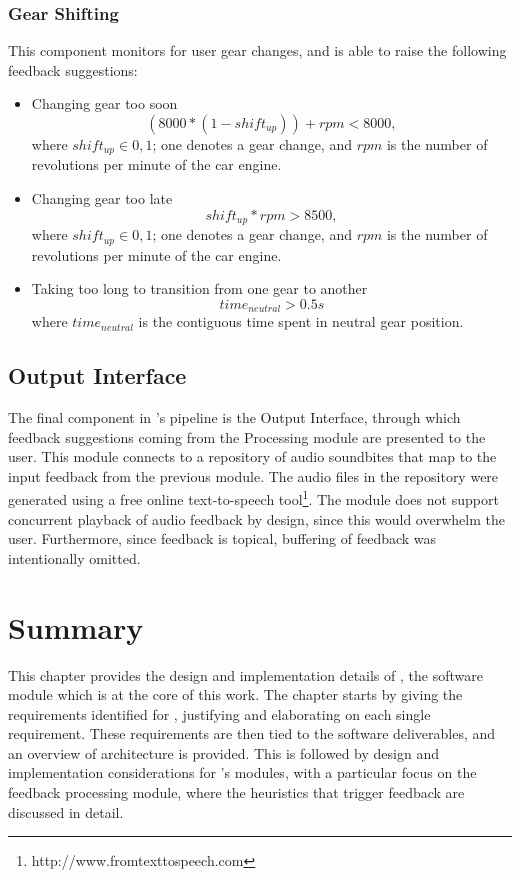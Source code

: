 \subsubsection{Gear Shifting}
This component monitors for user gear changes, and is able to raise the following feedback suggestions:
\begin{itemize}
	\item Changing gear too soon
	\begin{equation}
		(8000 * (1 - shift_{up})) + rpm < 8000,
	\end{equation}
	where $shift_{up} \in {0,1}$; one denotes a gear change, and $rpm$ is the number of revolutions per minute of the car engine.	
	\item Changing gear too late
	\begin{equation}
		shift_{up} * rpm > 8500,
	\end{equation}
	where $shift_{up} \in {0,1}$; one denotes a gear change, and $rpm$ is the number of revolutions per minute of the car engine.
	\item Taking too long to transition from one gear to another
	\begin{equation}
		time_{neutral} > 0.5s
	\end{equation}
	where $time_{neutral}$ is the contiguous time spent in neutral gear position.
\end{itemize}

\subsection{Output Interface}
The final component in \methodname's pipeline is the Output Interface, through which feedback suggestions coming from the Processing module are presented to the user. This module connects to a repository of audio soundbites that map to the input feedback from the previous module. The audio files in the repository were generated using a free online text-to-speech tool\footnote{http://www.fromtexttospeech.com}. The module does not support concurrent playback of audio feedback by design, since this would overwhelm the user. Furthermore, since feedback is topical, buffering of feedback was intentionally omitted.

\section{Summary}
This chapter provides the design and implementation details of \methodname, the software module which is at the core of this work. The chapter starts by giving the requirements identified for \methodname, justifying and elaborating on each single requirement. These requirements are then tied to the software deliverables, and an overview of \methodname architecture is provided. This is followed by design and implementation considerations for \methodname's modules, with a particular focus on the feedback processing module, where the heuristics that trigger feedback are discussed in detail.